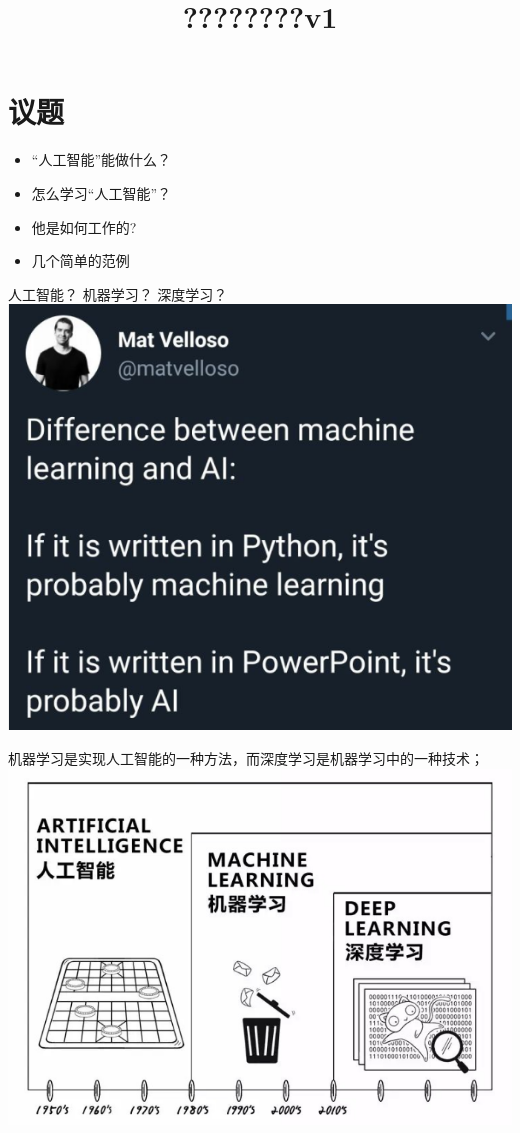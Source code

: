 \documentclass[11pt]{article}
\title{????????v1}
\makeatletter
\def\maxwidth{\ifdim\Gin@nat@width>\linewidth\linewidth
    \else\Gin@nat@width\fi}
\let\Oldincludegraphics\includegraphics
\renewcommand{\includegraphics}[1]{\Oldincludegraphics[width=.8\maxwidth]{#1}}
\makeatother
\begin{document}
    
    
    \maketitle
    
    

    
    \hypertarget{ux8baeux9898}{%
\section{议题}\label{ux8baeux9898}}

\begin{itemize}
\item
  ``人工智能''能做什么？
\item
  怎么学习``人工智能''？
\item
  他是如何工作的?
\item
  几个简单的范例
\end{itemize}

    人工智能？ 机器学习？ 深度学习？ \includegraphics{img/twitter.png}

    机器学习是实现人工智能的一种方法，而深度学习是机器学习中的一种技术；
\includegraphics{img/aimldl.png}
\end{document}
